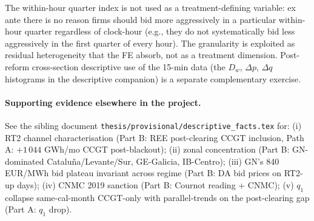 \documentclass[11pt,a4paper]{article}
\newcommand{\code}[1]{\nolinkurl{#1}}
\begin{document}
The within-hour quarter index is not used as a treatment-defining variable: ex ante there is no reason firms should bid more aggressively in a particular within-hour quarter regardless of clock-hour (e.g., they do not systematically bid less aggressively in the first quarter of every hour). The granularity is exploited as residual heterogeneity that the FE absorb, not as a treatment dimension. Post-reform cross-section descriptive use of the 15-min data (the $D_w$, $\Delta p$, $\Delta q$ histograms in the descriptive companion) is a separate complementary exercise.

\paragraph{Supporting evidence elsewhere in the project.}
See the sibling document \code{thesis/provisional/descriptive_facts.tex} for: (i) RT2 channel characterisation (Part B: REE post-clearing CCGT inclusion, Path A: $+1\,044$ GWh/mo CCGT post-blackout); (ii) zonal concentration (Part B: GN-dominated Cataluña/Levante/Sur, GE-Galicia, IB-Centro); (iii) GN's 840 EUR/MWh bid plateau invariant across regime (Part B: DA bid prices on RT2-up days); (iv) CNMC 2019 sanction (Part B: Cournot reading + CNMC); (v) $q_1$ collapse same-cal-month CCGT-only with parallel-trends on the post-clearing gap (Part A: $q_1$ drop).

\end{document}
